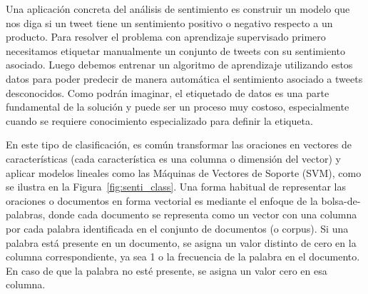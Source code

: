 Una aplicación concreta del análisis de sentimiento es construir un modelo que nos diga si un tweet tiene un sentimiento positivo o negativo respecto a un producto. Para resolver el problema con aprendizaje supervisado primero necesitamos etiquetar manualmente un conjunto de tweets con su sentimiento asociado. Luego debemos entrenar un algoritmo de aprendizaje utilizando estos datos para poder predecir de manera automática el sentimiento asociado a tweets desconocidos. Como podrán imaginar, el etiquetado de datos es una parte fundamental de la solución y puede ser un proceso muy costoso, especialmente cuando se requiere conocimiento especializado para definir la etiqueta.

En este tipo de clasificación, es común transformar las oraciones en vectores de características (cada característica es una columna o dimensión del vector) y aplicar modelos lineales como las Máquinas de Vectores de Soporte (SVM), como se ilustra en la Figura~\ref{fig:senti_class}. Una forma habitual de representar las oraciones o documentos en forma vectorial es mediante el enfoque de la bolsa-de-palabras, donde cada documento se representa como un vector con una columna por cada palabra identificada en el conjunto de documentos (o corpus). Si una palabra está presente en un documento, se asigna un valor distinto de cero en la columna correspondiente, ya sea 1 o la frecuencia de la palabra en el documento. En caso de que la palabra no esté presente, se asigna un valor cero en esa columna.

